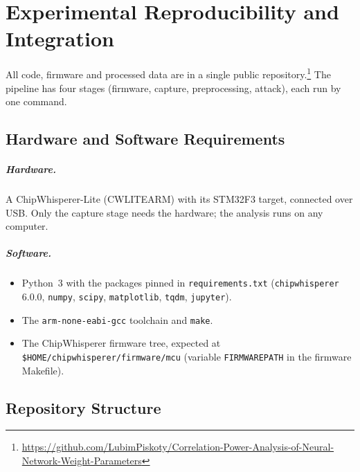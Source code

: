 \chapter{Experimental Reproducibility and Integration}
\label{chap:reproducibility}

All code, firmware and processed data are in a single public repository.\footnote{\url{https://github.com/LubimPiskoty/Correlation-Power-Analysis-of-Neural-Network-Weight-Parameters}}
The pipeline has four stages (firmware, capture, preprocessing, attack), each run by one command.

\section{Hardware and Software Requirements}

\paragraph{Hardware.}
A ChipWhisperer-Lite (CWLITEARM) with its STM32F3 target, connected over USB.
Only the capture stage needs the hardware; the analysis runs on any computer.

\paragraph{Software.}
\begin{itemize}
	\item Python~3 with the packages pinned in \texttt{requirements.txt} (\texttt{chipwhisperer} 6.0.0, \texttt{numpy}, \texttt{scipy}, \texttt{matplotlib}, \texttt{tqdm}, \texttt{jupyter}).
	\item The \texttt{arm-none-eabi-gcc} toolchain and \texttt{make}.
	\item The ChipWhisperer firmware tree, expected at \texttt{\$HOME/chipwhisperer/firmware/mcu} (variable \texttt{FIRMWAREPATH} in the firmware Makefile).
\end{itemize}

\section{Repository Structure}


